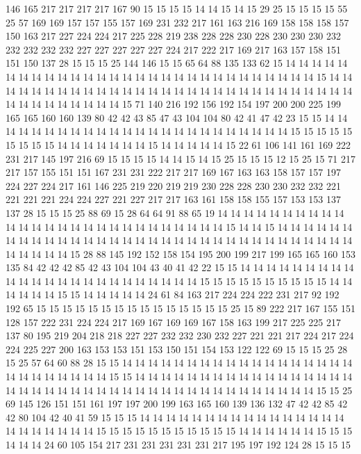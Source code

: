 146 165 217 217 217 217 167 90 15 15 15 15 14 14 15 14 15 29 25 15
15 15 15 55 25 57 169 169 157 157 155 157 169 231 232 217 161 163 216 169
158 158 158 157 150 163 217 227 224 224 217 225 228 219 238 228 228 230 228 230
230 230 232 232 232 232 232 227 227 227 227 227 224 217 222 217 169 217 163 157
158 151 151 150 137 28 15 15 15 25 144 146 15 15 65 64 88 135 133 62
15 14 14 14 14 14 14 14 14 14 14 14 14 14 14 14 14 14 14 14
14 14 14 14 14 14 14 14 14 14 15 14 14 14 14 14 14 14 14 14
14 14 14 14 14 14 14 14 14 14 14 14 14 14 14 14 14 14 14 14
14 14 14 14 14 14 14 14 14 15 71 140 216 192 156 192 154 197 200 200
225 199 165 165 160 160 139 80 42 42 43 85 47 43 104 104 80 42 41 47
42 23 15 15 14 14 14 14 14 14 14 14 14 14 14 14 14 14 14 14
14 14 14 14 14 14 14 14 15 15 15 15 15 15 15 15 15 14 14 14
14 14 14 14 15 14 14 14 14 14 15 22 61 106 141 161 169 222 231 217
145 197 216 69 15 15 15 15 14 14 15 14 15 25 15 15 15 12 15 25
15 71 217 217 157 155 151 151 167 231 231 222 217 217 169 167 163 163 158 157
157 197 224 227 224 217 161 146 225 219 220 219 219 230 228 228 230 230 232 232
221 221 221 221 224 224 227 221 227 217 217 163 161 158 158 155 157 153 153 137
137 28 15 15 15 25 88 69 15 28 64 64 91 88 65 19 14 14 14 14
14 14 14 14 14 14 14 14 14 14 14 14 14 14 14 14 14 14 14 14
14 14 14 15 14 14 15 14 14 14 14 14 14 14 14 14 14 14 14 14
14 14 14 14 14 14 14 14 14 14 14 14 14 14 14 14 14 14 14 14
14 14 14 14 14 15 28 88 145 192 152 158 154 195 200 199 217 199 165 165
160 153 135 84 42 42 42 85 42 43 104 104 43 40 41 42 22 15 15 14
14 14 14 14 14 14 14 14 14 14 14 14 14 14 14 14 14 14 14 14
14 14 14 15 15 15 15 15 15 15 15 15 15 14 14 14 14 14 14 15
15 14 14 14 14 14 24 61 84 163 217 224 224 222 231 217 92 192 192 65
15 15 15 15 15 15 15 15 15 15 15 15 15 15 15 25 15 89 222 217
167 155 151 128 157 222 231 224 224 217 169 167 169 169 167 158 163 199 217 225
225 217 137 80 195 219 204 218 218 227 227 232 232 230 232 227 221 221 217 224
217 224 224 225 227 200 163 153 153 151 153 150 151 154 153 122 122 69 15 15
15 25 28 15 25 57 64 60 88 28 15 15 14 14 14 14 14 14 14 14
14 14 14 14 14 14 14 14 14 14 14 14 14 14 14 14 14 14 15 15
14 14 14 14 14 14 14 14 14 14 14 14 14 14 14 14 14 14 14 14
14 14 14 14 14 14 14 14 14 14 14 14 14 14 14 14 14 14 14 14
14 15 15 25 69 145 126 151 151 161 197 197 200 199 163 165 160 139 136 132
47 42 42 85 42 42 80 104 42 40 41 59 15 15 15 14 14 14 14 14
14 14 14 14 14 14 14 14 14 14 14 14 14 14 14 14 14 14 15 15
15 15 15 15 15 15 15 15 15 14 14 14 14 14 14 15 15 15 14 14
14 24 60 105 154 217 231 231 231 231 231 217 195 197 192 124 28 15 15 15
